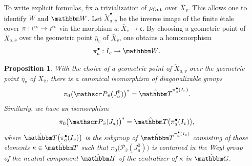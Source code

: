 \documentclass[12pt,english]{smfart}
\numberwithin{equation}{subsection}
\newtheorem{proposition}[equation]{Proposition}
\theoremstyle{remark}
\newcommand\calP{{\mathscr P}}
\newcommand\frakt{{\mathfrak t}}
\newcommand\frakc{{\mathfrak c}}
\newcommand\bbH{{\mathbbm H}}
\newcommand\bbW{{\mathbbm W}}
\newcommand\bbT{{\mathbbm T}}
\newcommand\bbG{{\mathbbm G}}
\newcommand\Out{{\rm Out}}
\newcommand\rs{{\rm rs}}
\begin{document}
To write explicit formulas, fix a trivialization of $\rho_{\Out}$ over $\bar X_v$. This allows one to identify $W$ and $\bbW$. Let $\widetilde X_{a,\bar v}^\bullet$ be the inverse image of the finite \'etale cover $\pi:\frakt^\rs\to\frakc^\rs$ via the morphism $a:\bar X_{\bar v}\to \frakc$. By choosing a geometric point of $\widetilde X_{a,\bar v}$ over the geometric point $\bar\eta_v$ of $\bar X_{\bar v}$, one obtains a homomorphism
$$\pi_a^\bullet: I_v \to \bbW.$$

\begin{proposition}\label{pi 0 local}
With the choice of a geometric point of $\widetilde X_{a,\bar v}$ over the geometric point $\bar\eta_v$ of $\bar X_{\bar v}$, there is a canonical isomorphism of diagonalizable groups
$$
\pi_0\bigl(\calP_{\bar v}(J_a^0)\bigr)^* = \hat{\bbT}^{\pi_a^\bullet(I_v)}.
$$
Similarly, we have an isomorphism
$$
\pi_0\bigl(\calP_{\bar v}(J_a)\bigr)^* = \hat{\bbT}\bigl(\pi_a^\bullet(I_v)\bigr),
$$
where $\hat{\bbT}\bigl(\pi_a^\bullet(I_v)\bigr)$ is the subgroup of $\hat{\bbT}^{\pi_a^\bullet(I_v)}$ consisting of those elements $\kappa\in \hat{\bbT}$ such that $\pi_0\bigl(\calP_{\bar v}(J_a^0)\bigr)$ is contained in the Weyl group of the neutral component $\hat{\bbH}$ of the centralizer of $\kappa$ in $\hat{\bbG}$.
\end{proposition}
\end{document}
